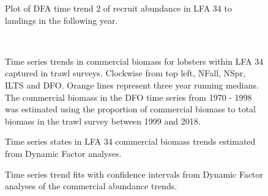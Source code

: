 \documentclass[11pt]{article}
\newcommand{\e}{/SpinDr/backup/bio_data/bio.lobster/figures/LFA3438Framework2019/} %
\begin{document}
\begin{figure}
    \centering
        \caption{Plot of DFA time trend 2 of recruit abundance in LFA 34 to landings in the following year.}

    \end{figure}





\begin{figure}
        \centering
    \\
                
        
         \caption{Time series trends in commercial biomass for lobsters within LFA 34 captured in trawl surveys. Clockwise from top left, NFall, NSpr, ILTS and DFO.
         Orange lines represent three year running medians. The commercial biomass in the DFO time series from 1970 - 1998 was estimated using the proportion of commercial biomass to total biomass in the trawl survey between 1999 and 2018.}
        \end{figure}

   \begin{figure}
    \centering
        \caption{Time series states in LFA 34 commercial biomass trends estimated from Dynamic Factor analyses.}

    \end{figure}

\begin{figure}
    \centering
        \caption{Time series trend fits with confidence intervals from Dynamic Factor analyses of the commercial abundance trends.}

    \end{figure}
\end{document}
